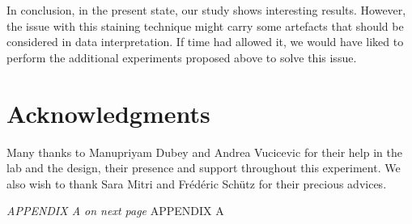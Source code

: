 \documentclass[a4paper, 10pt, conference]{ieeeconf}   %
\begin{document}
In conclusion, in the present state, our study shows interesting results. However, the issue with this staining technique might carry some artefacts that should be considered in data interpretation. If time had allowed it, we would have liked to perform the additional experiments proposed above to solve this issue.
 











\section*{Acknowledgments}
Many thanks to Manupriyam Dubey and Andrea Vucicevic for their help in the lab and the design, their presence and support throughout this experiment. We also wish to thank Sara Mitri and Frédéric Schütz for their precious advices.



\printbibliography
\vspace*{\fill}
\textit{APPENDIX A on next page}
\clearpage
APPENDIX A
\end{document}
